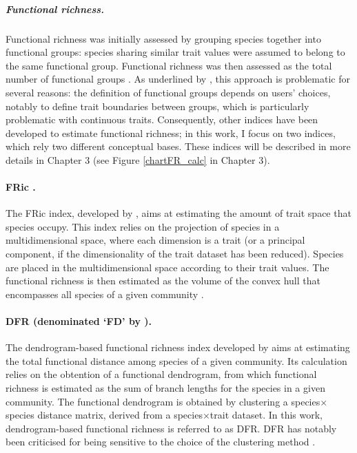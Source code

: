 \subparagraph{Functional richness.} 
Functional richness was initially assessed by grouping species together into functional groups: species sharing similar trait values were assumed to belong to the same functional group. Functional richness was then assessed as the total number of functional groups \citep{Legras2018}. As underlined by \citet{Legras2018}, this approach is problematic for several reasons: the definition of functional groups depends on users' choices, notably to define trait boundaries between groups, which is particularly problematic with continuous traits. Consequently, other indices have been developed to estimate functional richness; in this work, I focus on two indices, which rely two different conceptual bases. These indices will be described in more details in Chapter 3 (see Figure \ref{chartFR_calc} in Chapter 3).

\paragraph{FRic \citep{Villeger2008}.}
The FRic index, developed by \citet{Villeger2008}, aims at estimating the amount of trait space that species occupy. This index relies on the projection of species in a multidimensional space, where each dimension is a trait (or a principal component, if the dimensionality of the trait dataset has been reduced). Species are placed in the multidimensional space according to their trait values. The functional richness is then estimated as the volume of the convex hull that encompasses all species of a given community \citep{Villeger2008}.
  
\paragraph{DFR (denominated `FD' by \citet{Petchey2002}).}
The dendrogram-based functional richness index developed by \citet{Petchey2002} aims at estimating the total functional distance among species of a given community. Its calculation relies on the obtention of a functional dendrogram, from which functional richness is estimated as the sum of branch lengths for the species in a given community. The functional dendrogram is obtained by clustering a species$\times$species distance matrix, derived from a species$\times$trait dataset. In this work, dendrogram-based functional richness is referred to as DFR. DFR has notably been criticised for being sensitive to the choice of the clustering method \citep{Legras2018}.
 
